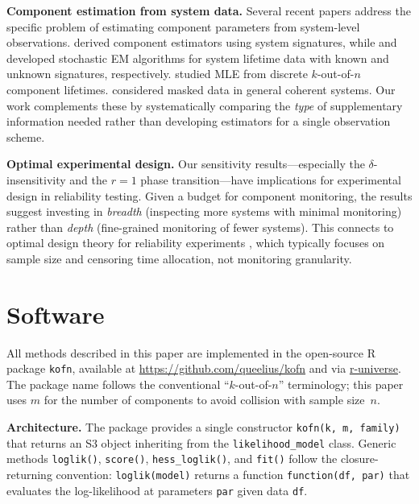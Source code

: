\documentclass[12pt]{article}
\begin{document}
\textbf{Component estimation from system data.}
Several recent papers address the specific problem of estimating component
parameters from system-level observations.
\citet{BhattacharyaSamaniego2010} derived component estimators using
system signatures, while \citet{NgNavarroBalakrishnan2017} and
\citet{YangNgBalakrishnan2019} developed stochastic EM algorithms for
system lifetime data with known and unknown signatures, respectively.
\citet{DembinskaJasinski2021} studied MLE from discrete $k$-out-of-$n$
component lifetimes.  \citet{RodriguesPereira2019} considered masked
data in general coherent systems.  Our work complements these by
systematically comparing the \emph{type} of supplementary information
needed rather than developing estimators for a single observation scheme.

\textbf{Optimal experimental design.}
Our sensitivity results---especially the $\delta$-insensitivity and the
$r = 1$ phase transition---have implications for experimental design in
reliability testing.  Given a budget for component monitoring,
the results suggest investing in \emph{breadth} (inspecting more systems
with minimal monitoring) rather than \emph{depth} (fine-grained monitoring
of fewer systems).  This connects to optimal design theory for reliability
experiments \citep{AtkinsonDonev1992}, which typically focuses on sample
size and censoring time allocation, not monitoring granularity.


\section{Software}\label{sec:software}

All methods described in this paper are implemented in the open-source R
package \texttt{kofn}, available at
\url{https://github.com/queelius/kofn} and via
\href{https://queelius.r-universe.dev}{r-universe}.
The package name follows the conventional ``$k$-out-of-$n$'' terminology;
this paper uses $m$ for the number of components to avoid collision with
sample size~$n$.

\textbf{Architecture.}
The package provides a single constructor \texttt{kofn(k, m, family)}
that returns an S3 object inheriting from the \texttt{likelihood\_model}
class.  Generic methods \texttt{loglik()}, \texttt{score()},
\texttt{hess\_loglik()}, and \texttt{fit()} follow the closure-returning
convention: \texttt{loglik(model)} returns a function
\texttt{function(df, par)} that evaluates the log-likelihood at
parameters \texttt{par} given data \texttt{df}.
\end{document}
